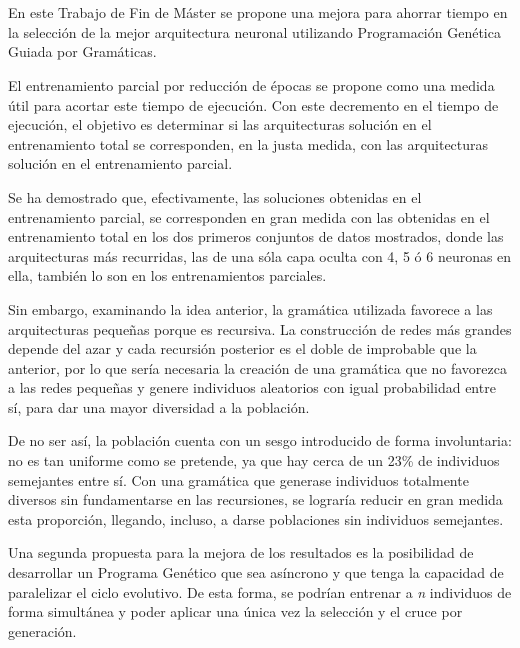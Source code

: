 \documentclass[spanish,a4paper,12pt,twoside]{report}
\begin{document}
  \chapter{\vspace{-3cm}{\LARGE 8. Conclusiones y líneas futuras}}
  \setcounter{figure}{24}
  \vspace{-1cm}
  En este Trabajo de Fin de Máster se propone una mejora para ahorrar tiempo en la selección de la mejor arquitectura neuronal utilizando Programación Genética Guiada por Gramáticas. \par
  El entrenamiento parcial por reducción de épocas se propone como una medida útil para acortar este tiempo de ejecución. Con este decremento en el tiempo de ejecución, el objetivo es determinar si las arquitecturas solución en el entrenamiento total se corresponden, en la justa medida, con las arquitecturas solución en el entrenamiento parcial. \par
  Se ha demostrado que, efectivamente, las soluciones obtenidas en el entrenamiento parcial, se corresponden en gran medida con las obtenidas en el entrenamiento total en los dos primeros conjuntos de datos mostrados, donde las arquitecturas más recurridas, las de una sóla capa oculta con 4, 5 ó 6 neuronas en ella, también lo son en los entrenamientos parciales. \par
  Sin embargo, examinando la idea anterior, la gramática utilizada favorece a las arquitecturas pequeñas porque es recursiva. La construcción de redes más grandes depende del azar y cada recursión posterior es el doble de improbable que la anterior, por lo que sería necesaria la creación de una gramática que no favorezca a las redes pequeñas y genere individuos aleatorios con igual probabilidad entre sí, para dar una mayor diversidad a la población. \par
  De no ser así, la población cuenta con un sesgo introducido de forma involuntaria: no es tan uniforme como se pretende, ya que hay cerca de un 23\% de individuos semejantes entre sí. Con una gramática que generase individuos totalmente diversos sin fundamentarse en las recursiones, se lograría reducir en gran medida esta proporción, llegando, incluso, a darse poblaciones sin individuos semejantes.  \par
  Una segunda propuesta para la mejora de los resultados es la posibilidad de desarrollar un Programa Genético que sea asíncrono y que tenga la capacidad de paralelizar el ciclo evolutivo. De esta forma, se podrían entrenar a \emph{n} individuos de forma simultánea y poder aplicar una única vez la selección y el cruce por generación.
  
\end{document}
